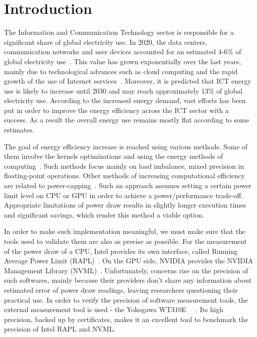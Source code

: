 \chapter*{Introduction}

The Information and Communication Technology sector is responsible
for a significant share of global electricity use. In 2020,
the data centers, communication networks and user devices
accounted for an estimated 4-6\% of global electricity
use~\cite{Energy_Consumption_of_ICT}. This value has grown
exponentially over the last years, mainly due to technological
advances such as cloud computing and the rapid growth of the use of
Internet services~\cite{Data_Centre_Energy_Consumption}. Moreover,
it is predicted that ICT energy use is likely to increase
until 2030 and may reach approximately 13\% of global electricity
use. According to the increased energy demand, vast efforts has
been put in order to improve the energy efficiency across the
ICT sector with a success. As a result the overall energy use
remains mostly flat according  to some estimates.

The goal of energy efficiency increase is reached using various
methods. Some of them involve the kernels optimizations and
using the energy methods of
computing~\cite{Software_Methods_of_Energy_Efficiency}.
Such methods focus mainly on load imbalance, mixed precision
in floating-point operations. Other methods of increasing
computational efficiency are related to
power-capping~\cite{Parallel_Apps_Power_Capping_Czarnul}.
Such an approach assumes setting a certain power limit level on
CPU or GPU in order to achieve a power/performance trade-off.
Appropriate limitations of power draw results in slightly
longer execution times and significant savings, which render
this method a viable option.

In order to make such implementation meaningful, we must make
sure that the tools used to validate them are also as precise
as possible. For the measurement of the power draw of a CPU,
Intel provides its own interface, called Running Average Power
Limit (RAPL)~\cite{RAPL_Reporting}. On the GPU side, NVIDIA
provides the NVIDIA Management Library (NVML)~\cite{NVML}.
Unfortunately, concerns rise on the precision of such softwares,
mainly because their providers don't share any information about
estimated error of power draw readings, leaving researchers
questioning their practical use. In order to verify the
precision of software measurement tools, the external
measurement tool is used - the Yokogawa
WT310E~\cite{Yokogawa_Producent_Page}
~\cite{Yokogawa_Meter_Series_Specifications}.
Its high precision, backed up by certificates, makes it an
excellent tool to benchmark the precision of Intel RAPL and NVML.
